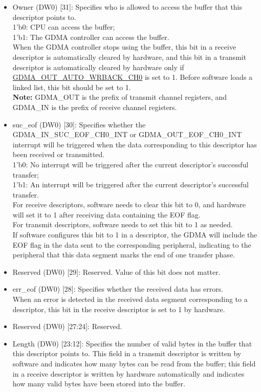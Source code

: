 \documentclass[main\_\_EN.tex]{subfiles}
\begin{document}
\begin{itemize}
    \item Owner (DW0) [31]: Specifies who is allowed to access the buffer that this descriptor points to.\\
    1'b0: CPU can access the buffer; \\
    1'b1: The GDMA controller can access the buffer.\\
    When the GDMA controller stops using the buffer, this bit in a receive descriptor is automatically cleared by hardware, and this bit in a transmit descriptor is automatically cleared by hardware only if \hyperref[fielddesc:GDMAOUTAUTOWRBACKCH0]{GDMA\_OUT\_AUTO\_WRBACK\_CH0} is set to 1.
    Before software loads a linked list, this bit should be set to 1.
    \\{\bfseries Note:} GDMA\_OUT is the prefix of transmit channel registers, and GDMA\_IN is the prefix of receive channel registers.
    \item suc\_eof (DW0) [30]: Specifies whether the GDMA\_IN\_SUC\_EOF\_CH0\_INT or GDMA\_OUT\_EOF\_CH0\_INT interrupt will be triggered when the data corresponding to this descriptor has been received or transmitted.\\
    1'b0: No interrupt will be triggered after the current descriptor's successful transfer;\\
    1'b1: An interrupt will be triggered after the current descriptor's successful transfer.\\
    For receive descriptors, software needs to clear this bit to 0, and hardware will set it to 1 after receiving data containing the EOF flag.\\
    For transmit descriptors, software needs to set this bit to 1 as needed.\\
    If software configures this bit to 1 in a descriptor, the GDMA will include the EOF flag in the data sent to the corresponding peripheral, indicating to the peripheral that this data segment marks the end of one transfer phase.
    \item Reserved (DW0) [29]: Reserved. Value of this bit does not matter.
    \item err\_eof (DW0) [28]: Specifies whether the received data has errors.\\
    When an error is detected in the received data segment corresponding to a descriptor, this bit in the receive descriptor is set to 1 by hardware.
    \item Reserved (DW0) [27:24]: Reserved.
    \item Length (DW0) [23:12]: Specifies the number of valid bytes in the buffer that this descriptor points to. This field in a transmit descriptor is written by software and indicates how many bytes can be read from the buffer; this field in a receive descriptor is written by hardware automatically and indicates how many valid bytes have been stored into the buffer.

\end{itemize}
\end{document}
